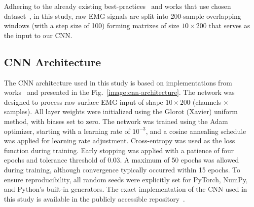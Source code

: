Adhering to the already existing best-practices~\cite{Smith2011} and works that use chosen dataset~\cite{Cote2019_3DC,LibEMG2023}, in this study, raw EMG signals are split into 200-sample overlapping windows (with a step size of 100) forming matrixes of size $10 \times 200$ that serves as the input to our CNN. 

\subsection*{CNN Architecture}

The CNN architecture used in this study is based on implementations from works~\cite{Cote2019_3DC,LibEMG2023} and presented in the Fig.~\ref{image:cnn-architecture}. 
The network was designed to process raw surface EMG input of shape $10 \times 200$ (channels × samples).
All layer weights were initialized using the Glorot (Xavier) uniform method, with biases set to zero. The network was trained using the Adam optimizer, starting with a learning rate of $10^{-3}$, and a cosine annealing schedule was applied for learning rate adjustment. Cross-entropy was used as the loss function during training. Early stopping was applied with a patience of four epochs and tolerance threshold of 0.03. A maximum of 50 epochs was allowed during training, although convergence typically occurred within 15 epochs. To ensure reproducibility, all random seeds were explicitly set for PyTorch, NumPy, and Python’s built-in generators.
The exact implementation of the CNN used in this study is available in the publicly accessible repository~\cite{Kolomiiets2025}.

